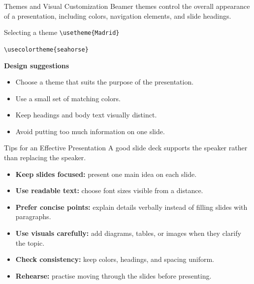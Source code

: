 \documentclass[11pt,aspectratio=43]{beamer}
\begin{document}
\begin{frame}{Themes and Visual Customization}
  Beamer themes control the overall appearance of a presentation, including colors, navigation elements, and slide headings.
  \vspace{0.12cm}
  \begin{block}{Selecting a theme}
    \small
    \texttt{\textbackslash usetheme\{Madrid\}}\par
    \texttt{\textbackslash usecolortheme\{seahorse\}}
  \end{block}
  \textbf{Design suggestions}
  \begin{itemize}
    \item Choose a theme that suits the purpose of the presentation.
    \item Use a small set of matching colors.
    \item Keep headings and body text visually distinct.
    \item Avoid putting too much information on one slide.
  \end{itemize}
\end{frame}

\begin{frame}{Tips for an Effective Presentation}
  A good slide deck supports the speaker rather than replacing the speaker.
  \vspace{0.12cm}
  \begin{itemize}
    \item \textbf{Keep slides focused:} present one main idea on each slide.
    \item \textbf{Use readable text:} choose font sizes visible from a distance.
    \item \textbf{Prefer concise points:} explain details verbally instead of filling slides with paragraphs.
    \item \textbf{Use visuals carefully:} add diagrams, tables, or images when they clarify the topic.
    \item \textbf{Check consistency:} keep colors, headings, and spacing uniform.
    \item \textbf{Rehearse:} practise moving through the slides before presenting.
  \end{itemize}
\end{frame}
\end{document}
